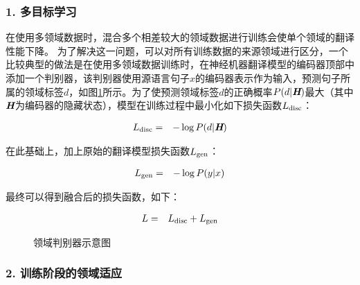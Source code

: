 \subsubsection{1. 多目标学习}

\parinterval 在使用多领域数据时，混合多个相差较大的领域数据进行训练会使单个领域的翻译性能下降。 为了解决这一问题，可以对所有训练数据的来源领域进行区分，一个比较典型的做法是在使用多领域数据训练时，在神经机器翻译模型的编码器顶部中添加一个判别器，该判别器使用源语言句子$x$的编码器表示作为输入，预测句子所属的领域标签$d$，如图\ref{fig:16-21}所示。为了使预测领域标签$d$的正确概率${P(d|\textbf{\em H})}$最大（其中$\textbf{\em H}$为编码器的隐藏状态），模型在训练过程中最小化如下损失函数${L}_{\rm{disc}}$：

\begin{eqnarray}
{L}_{\rm{disc}}& = &-\log{P}(d|\textbf{\em H})
\label{eq:16-12}
\end{eqnarray}

\noindent 在此基础上，加上原始的翻译模型损失函数${L}_{\rm{gen}}$：

\begin{eqnarray}
{L}_{\rm{gen}}& = & -\log{P}(y|x)\label{eq:16-13}
\end{eqnarray}

\noindent 最终可以得到融合后的损失函数，如下：

\begin{eqnarray}
{L} & = & {L}_{\rm{disc}}+{L}_{\rm{gen}}\label{eq:16-14}
\end{eqnarray}


\begin{figure}[h]
\centering

\caption{领域判别器示意图}
\label{fig:16-21}
\end{figure}

\subsubsection{2. 训练阶段的领域适应}

